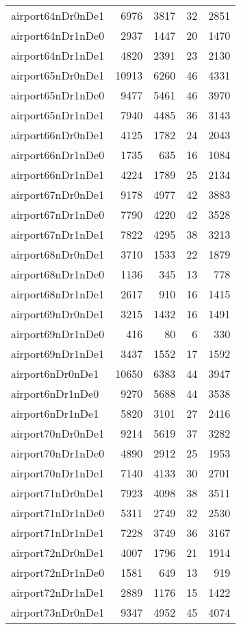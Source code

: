 \begin{longtable}{lrrrr}
airport64nDr0nDe1 & 6976 & 3817 & 32 & 2851 \\
airport64nDr1nDe0 & 2937 & 1447 & 20 & 1470 \\
airport64nDr1nDe1 & 4820 & 2391 & 23 & 2130 \\
airport65nDr0nDe1 & 10913 & 6260 & 46 & 4331 \\
airport65nDr1nDe0 & 9477 & 5461 & 46 & 3970 \\
airport65nDr1nDe1 & 7940 & 4485 & 36 & 3143 \\
airport66nDr0nDe1 & 4125 & 1782 & 24 & 2043 \\
airport66nDr1nDe0 & 1735 & 635 & 16 & 1084 \\
airport66nDr1nDe1 & 4224 & 1789 & 25 & 2134 \\
airport67nDr0nDe1 & 9178 & 4977 & 42 & 3883 \\
airport67nDr1nDe0 & 7790 & 4220 & 42 & 3528 \\
airport67nDr1nDe1 & 7822 & 4295 & 38 & 3213 \\
airport68nDr0nDe1 & 3710 & 1533 & 22 & 1879 \\
airport68nDr1nDe0 & 1136 & 345 & 13 & 778 \\
airport68nDr1nDe1 & 2617 & 910 & 16 & 1415 \\
airport69nDr0nDe1 & 3215 & 1432 & 16 & 1491 \\
airport69nDr1nDe0 & 416 & 80 & 6 & 330 \\
airport69nDr1nDe1 & 3437 & 1552 & 17 & 1592 \\
airport6nDr0nDe1 & 10650 & 6383 & 44 & 3947 \\
airport6nDr1nDe0 & 9270 & 5688 & 44 & 3538 \\
airport6nDr1nDe1 & 5820 & 3101 & 27 & 2416 \\
airport70nDr0nDe1 & 9214 & 5619 & 37 & 3282 \\
airport70nDr1nDe0 & 4890 & 2912 & 25 & 1953 \\
airport70nDr1nDe1 & 7140 & 4133 & 30 & 2701 \\
airport71nDr0nDe1 & 7923 & 4098 & 38 & 3511 \\
airport71nDr1nDe0 & 5311 & 2749 & 32 & 2530 \\
airport71nDr1nDe1 & 7228 & 3749 & 36 & 3167 \\
airport72nDr0nDe1 & 4007 & 1796 & 21 & 1914 \\
airport72nDr1nDe0 & 1581 & 649 & 13 & 919 \\
airport72nDr1nDe1 & 2889 & 1176 & 15 & 1422 \\
airport73nDr0nDe1 & 9347 & 4952 & 45 & 4074 \\

\end{longtable}
